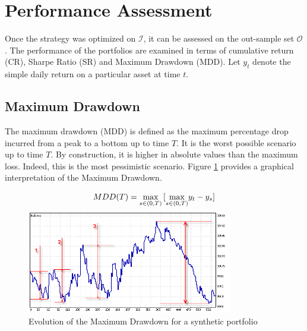 \documentclass[11pt,a4,twosided,singlespacing,titlepagenumber=on]{scrreprt}
\numberwithin{equation}{chapter} %
\theoremstyle{remark}
\begin{document}
\section{Performance Assessment}
Once the strategy was optimized on $\mathcal{I}$, it can be assessed on the out-sample set $\mathcal{O}$. The performance of the portfolios are examined in terms of cumulative return (CR), Sharpe Ratio (SR) and Maximum Drawdown (MDD). Let $y_t$ denote the simple daily return on a particular asset at time $t$. 

\subsection{Maximum Drawdown}
The maximum drawdown (MDD) is defined as the maximum percentage drop incurred from a peak to a bottom up to time $T$. It is the worst possible scenario up to time $T$. By construction, it is higher in absolute values than the maximum loss. Indeed, this is the most pessimistic scenario. Figure \ref{mdd} provides a graphical interpretation of the Maximum Drawdown.

\begin{equation}
MDD(T) = \smash{\displaystyle\max_{s \in (0,T)}} \left[\smash{\displaystyle\max_{s \in (0,T)}} y_t - y_s \right] 
\end{equation}

\begin{figure}[H]
\centering
\includegraphics[width = 0.8\textwidth]{mdd}
\caption{Evolution of the Maximum Drawdown for a synthetic portfolio}
\label{mdd}
\end{figure}
\end{document}
